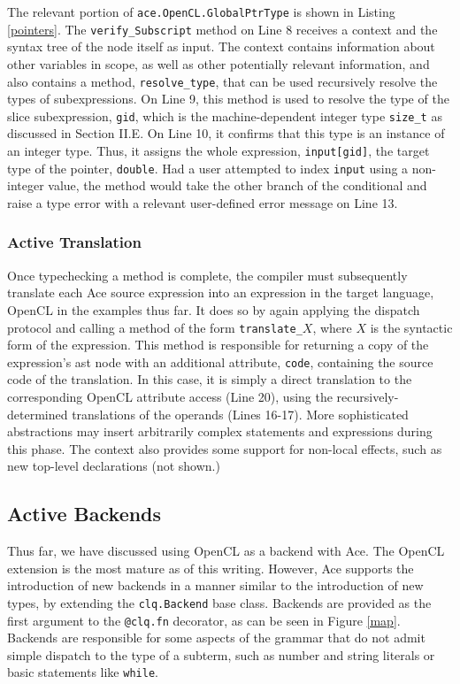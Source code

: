 \documentclass[10pt, conference, compsocconf]{IEEEtran}
\begin{document}
The relevant portion of \verb|ace.OpenCL.GlobalPtrType| is shown in Listing \ref{pointers}. The \verb|verify_Subscript| method on Line 8 receives a context and the syntax tree of the node itself as input. The context contains information about other variables in scope, as well as other potentially relevant information, and also contains a method, \verb|resolve_type|, that can be used recursively resolve the types of subexpressions. On Line 9, this method is used to resolve the type of the slice subexpression, \verb|gid|, which is the machine-dependent integer type \verb|size_t| as discussed in Section II.E. On Line 10, it confirms that this type is an instance of an integer type. Thus, it assigns the whole expression, \verb|input[gid]|, the target type of the pointer, \verb|double|. Had a user attempted to index \verb|input| using a non-integer value, the method would take the other branch of the conditional and raise a type error with a relevant user-defined error message on Line 13.

\subsubsection{Active Translation}
Once typechecking a method is complete, the compiler must subsequently translate each Ace source expression into an expression in the target language, OpenCL in the examples thus far. It does so by again applying the dispatch protocol and calling a method of the form \verb|translate_|$X$, where $X$ is the syntactic form of the expression. This method is responsible for returning a copy of the expression's ast node with an additional attribute, \verb|code|, containing the source code of the translation. In this case, it is simply a direct translation to the corresponding OpenCL attribute access (Line 20), using the recursively-determined translations of the operands (Lines 16-17).  More sophisticated abstractions may insert arbitrarily complex statements and expressions during this phase. The context also provides some support for non-local effects, such as new top-level declarations (not shown.)

\subsection{Active Backends}\label{backends}
Thus far, we have discussed using OpenCL as a backend with Ace. The OpenCL extension is the most mature as of this writing. However, Ace supports the introduction of new backends in a manner similar to the introduction of new types, by extending the \verb|clq.Backend| base class. Backends are provided as the first argument to the \verb|@clq.fn| decorator, as can be seen in Figure \ref{map}. 
Backends are responsible for some aspects of the grammar that do not admit simple dispatch to the type of a subterm, such as number and string literals or basic statements like \verb|while|.
\end{document}
